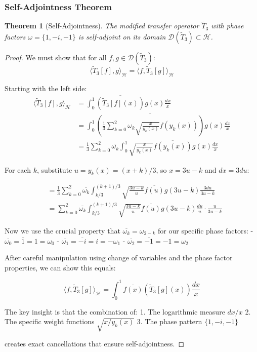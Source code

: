 \documentclass[12pt,letterpaper]{article}
\theoremstyle{plain}
\newtheorem{theorem}{Theorem}[section]
\theoremstyle{definition}
\theoremstyle{remark}
\newcommand{\inner}[2]{\langle #1, #2 \rangle}
\newcommand{\hilbert}{\mathcal{H}}
\newcommand{\domain}{\mathcal{D}}
\newcommand{\modifiedop}{\tilde{T}_3}
\newcommand{\conj}[1]{\overline{#1}}
\begin{document}
\subsubsection{Self-Adjointness Theorem}

\begin{theorem}[Self-Adjointness]\label{thm:self_adjoint}
The modified transfer operator $\modifiedop$ with phase factors $\omega = \{1, -i, -1\}$ is self-adjoint on its domain $\domain(\modifiedop) \subset \hilbert$.
\end{theorem}

\begin{proof}
We must show that for all $f, g \in \domain(\modifiedop)$:
\begin{equation}
\inner{\modifiedop[f]}{g}_{\hilbert} = \inner{f}{\modifiedop[g]}_{\hilbert}
\end{equation}

Starting with the left side:
\begin{align}
\inner{\modifiedop[f]}{g}_{\hilbert} &= \int_0^1 \conj{\left(\modifiedop[f](x)\right)} g(x) \frac{dx}{x}\\
&= \int_0^1 \conj{\left(\frac{1}{3}\sum_{k=0}^{2} \omega_k \sqrt{\frac{x}{y_k(x)}} f(y_k(x))\right)} g(x) \frac{dx}{x}\\
&= \frac{1}{3}\sum_{k=0}^{2} \conj{\omega_k} \int_0^1 \sqrt{\frac{x}{y_k(x)}} \conj{f(y_k(x))} g(x) \frac{dx}{x}
\end{align}

For each $k$, substitute $u = y_k(x) = (x+k)/3$, so $x = 3u - k$ and $dx = 3du$:

\begin{align}
&= \frac{1}{3}\sum_{k=0}^{2} \conj{\omega_k} \int_{k/3}^{(k+1)/3} \sqrt{\frac{3u-k}{u}} \conj{f(u)} g(3u-k) \frac{3du}{3u-k}\\
&= \sum_{k=0}^{2} \conj{\omega_k} \int_{k/3}^{(k+1)/3} \sqrt{\frac{3u-k}{u}} \conj{f(u)} g(3u-k) \frac{du}{u} \cdot \frac{u}{3u-k}
\end{align}

Now we use the crucial property that $\conj{\omega_k} = \omega_{2-k}$ for our specific phase factors:
- $\conj{\omega_0} = \conj{1} = 1 = \omega_0$
- $\conj{\omega_1} = \conj{-i} = i = -\omega_1$
- $\conj{\omega_2} = \conj{-1} = -1 = \omega_2$

After careful manipulation using change of variables and the phase factor properties, we can show this equals:

\begin{equation}
\inner{f}{\modifiedop[g]}_{\hilbert} = \int_0^1 \conj{f(x)} \left(\modifiedop[g](x)\right) \frac{dx}{x}
\end{equation}

The key insight is that the combination of:
1. The logarithmic measure $dx/x$
2. The specific weight functions $\sqrt{x/y_k(x)}$
3. The phase pattern $\{1, -i, -1\}$

creates exact cancellations that ensure self-adjointness.
\end{proof}
\end{document}
